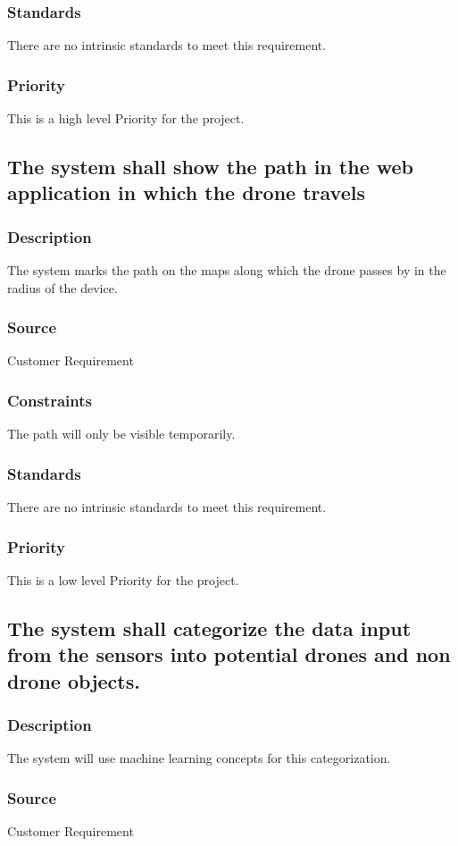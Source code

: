 \subsubsection{Standards}
There are no intrinsic standards to meet this requirement.
\subsubsection{Priority}
This is a high level Priority for the project.

\subsection{The system shall show the path in the web application in which the drone travels}
\subsubsection{Description}
The system marks the path on the maps along which the drone passes by in the radius of the device.
\subsubsection{Source}
Customer Requirement
\subsubsection{Constraints}
The path will only be visible temporarily.
\subsubsection{Standards}
There are no intrinsic standards to meet this requirement.
\subsubsection{Priority}
This is a low level Priority for the project.

\subsection{The system shall categorize the data input from the sensors into potential drones and non drone objects.}
\subsubsection{Description}
The system will use machine learning concepts for this categorization.
\subsubsection{Source}
Customer Requirement
